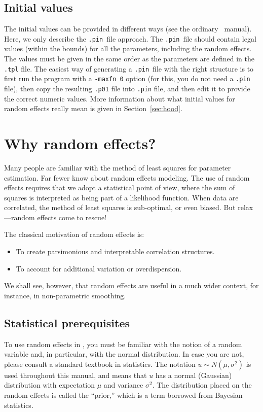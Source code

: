 \documentclass{admbmanual}
\begin{document}
\subsection{Initial values}

The initial values can be provided in different ways (see the ordinary \scAB\
manual). Here, we only describe the \texttt{.pin}~file approach. The
\texttt{.pin}~file should contain legal values (within the bounds) for all the
parameters, including the random effects. The values must be given in the same
order as the parameters are defined in the \texttt{.tpl} file. The easiest way
of generating a \texttt{.pin}~file with the right structure is to first run the
program with a \texttt{-maxfn 0} option (for this, you do not need a
\texttt{.pin} file), then copy the resulting \texttt{.p01} file into
\texttt{.pin} file, and then edit it to provide the correct numeric values. More
information about what initial values for random effects really mean is given in
Section~\ref{sec:hood}.

\section{Why random effects?}

Many people are familiar with the method of least squares for parameter
estimation. Far fewer know about random effects modeling. The use of random
effects requires that we adopt a statistical point of view, where the sum of
squares is interpreted as being part of a likelihood function. When data are
correlated, the method of least squares is sub-optimal, or even biased. But
relax---random effects come to rescue! \index{random effects}

The classical motivation of random effects is:
\begin{itemize}
\item To create parsimonious and interpretable correlation structures.

\item To account for additional variation or overdispersion.
\end{itemize}
We shall see, however, that random effects are useful in a much wider context,
for instance, in non-parametric smoothing. %

\subsection{Statistical prerequisites}

To use random effects in \scAB, you must be familiar with the notion of a random
variable and, in particular, with the normal distribution. In case you are not,
please consult a standard textbook in statistics. The notation $u\sim N(\mu
,\sigma ^{2})$ is used throughout this manual, and means that $u$ has a normal
(Gaussian) distribution with expectation $\mu$ and variance $\sigma ^{2}$. The
distribution placed on the random effects is called the ``prior,'' which is a
term borrowed from Bayesian statistics.
\end{document}
